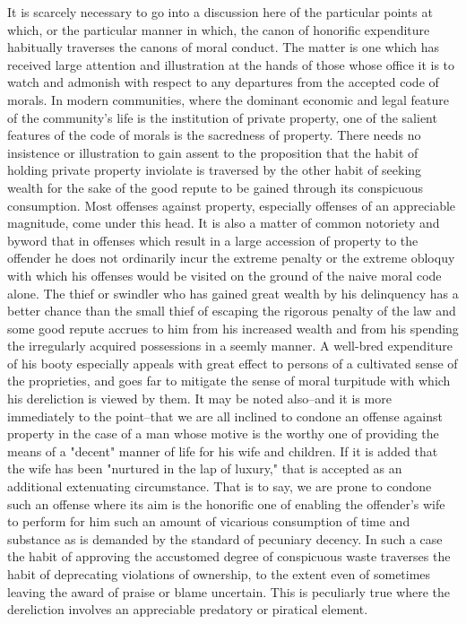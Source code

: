 \documentclass[12pt]{report}
\begin{document}
It is scarcely necessary to go into a discussion here of the particular
points at which, or the particular manner in which, the canon of
honorific expenditure habitually traverses the canons of moral conduct.
The matter is one which has received large attention and illustration at
the hands of those whose office it is to watch and admonish with
respect to any departures from the accepted code of morals. In modern
communities, where the dominant economic and legal feature of the
community's life is the institution of private property, one of the
salient features of the code of morals is the sacredness of property.
There needs no insistence or illustration to gain assent to the
proposition that the habit of holding private property inviolate is
traversed by the other habit of seeking wealth for the sake of the good
repute to be gained through its conspicuous consumption. Most offenses
against property, especially offenses of an appreciable magnitude, come
under this head. It is also a matter of common notoriety and byword
that in offenses which result in a large accession of property to the
offender he does not ordinarily incur the extreme penalty or the extreme
obloquy with which his offenses would be visited on the ground of the
naive moral code alone. The thief or swindler who has gained great
wealth by his delinquency has a better chance than the small thief of
escaping the rigorous penalty of the law and some good repute accrues
to him from his increased wealth and from his spending the irregularly
acquired possessions in a seemly manner. A well-bred expenditure of his
booty especially appeals with great effect to persons of a cultivated
sense of the proprieties, and goes far to mitigate the sense of moral
turpitude with which his dereliction is viewed by them. It may be noted
also--and it is more immediately to the point--that we are all inclined
to condone an offense against property in the case of a man whose motive
is the worthy one of providing the means of a "decent" manner of
life for his wife and children. If it is added that the wife has been
"nurtured in the lap of luxury," that is accepted as an additional
extenuating circumstance. That is to say, we are prone to condone such
an offense where its aim is the honorific one of enabling the offender's
wife to perform for him such an amount of vicarious consumption of time
and substance as is demanded by the standard of pecuniary decency. In
such a case the habit of approving the accustomed degree of conspicuous
waste traverses the habit of deprecating violations of ownership, to the
extent even of sometimes leaving the award of praise or blame uncertain.
This is peculiarly true where the dereliction involves an appreciable
predatory or piratical element.
\end{document}
